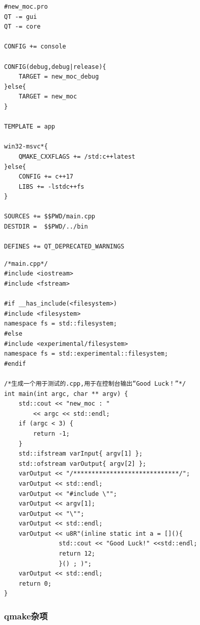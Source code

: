 \begin{lstlisting}[label=f00000b,
caption=GoodLuck,
title=\lstlistingname\ \thelstlisting
]
#new_moc.pro
QT -= gui
QT -= core

CONFIG += console

CONFIG(debug,debug|release){
    TARGET = new_moc_debug
}else{
    TARGET = new_moc
}

TEMPLATE = app

win32-msvc*{
    QMAKE_CXXFLAGS += /std:c++latest
}else{
    CONFIG += c++17
    LIBS += -lstdc++fs
}

SOURCES += $$PWD/main.cpp
DESTDIR =  $$PWD/../bin

DEFINES += QT_DEPRECATED_WARNINGS
\end{lstlisting}          %
\begin{lstlisting}[label=f00000c,
caption=GoodLuck,
title=\lstlistingname\ \thelstlisting
]
/*main.cpp*/
#include <iostream>
#include <fstream>

#if __has_include(<filesystem>)
#include <filesystem>
namespace fs = std::filesystem;
#else
#include <experimental/filesystem>
namespace fs = std::experimental::filesystem;
#endif

/*生成一个用于测试的.cpp,用于在控制台输出“Good Luck！”*/
int main(int argc, char ** argv) {
    std::cout << "new_moc : "
        << argc << std::endl;
    if (argc < 3) {
        return -1;
    }
    std::ifstream varInput{ argv[1] };
    std::ofstream varOutput{ argv[2] };
    varOutput << "/*****************************/";
    varOutput << std::endl;
    varOutput << "#include \"";
    varOutput << argv[1];
    varOutput << "\"";
    varOutput << std::endl;
    varOutput << u8R"(inline static int a = [](){
               std::cout << "Good Luck!" <<std::endl;
               return 12;
               }() ; )";
    varOutput << std::endl;
    return 0;
}
\end{lstlisting}          %


\subsubsection{
qmake杂项
}\label{ss000910}













